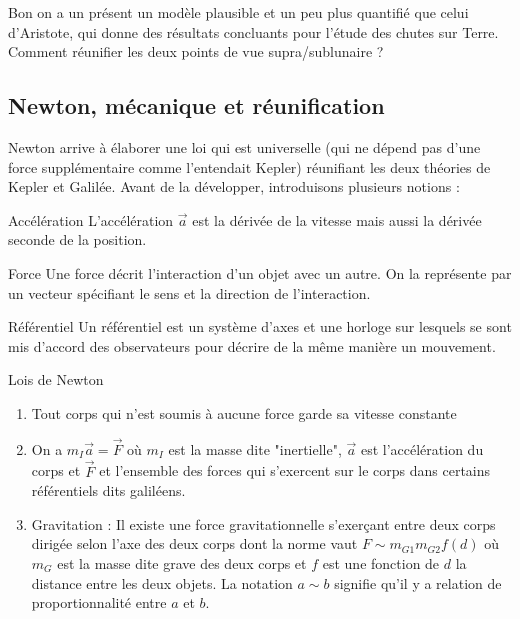 \documentclass{classe}
\begin{document}
Bon on a un présent un modèle plausible et un peu plus quantifié que celui d'Aristote, qui donne des résultats concluants pour l'étude des chutes sur Terre. Comment réunifier les deux points de vue supra/sublunaire ?

\subsection{Newton, mécanique et réunification}

Newton arrive à élaborer une loi qui est universelle (qui ne dépend pas d'une force supplémentaire comme l'entendait Kepler) réunifiant les deux théories de Kepler et Galilée. Avant de la développer, introduisons plusieurs notions :

\begin{définition}{Accélération}{}
L'accélération $\vec{a}$ est la dérivée de la vitesse mais aussi la dérivée seconde de la position.
\end{définition}

\begin{définition}{Force}{}
Une force décrit l'interaction d'un objet avec un autre. On la représente par un vecteur spécifiant le sens et la direction de l'interaction.
\end{définition}

\begin{définition}{Référentiel}{}
Un référentiel est un système d'axes et une horloge sur lesquels se sont mis d'accord des observateurs pour décrire de la même manière un mouvement.
\end{définition}

\begin{théorème}{Lois de Newton}{}
\begin{enumerate}
\item Tout corps qui n'est soumis à aucune force garde sa vitesse constante
\item On a $m_I\vec{a} = \vec{F}$ où $m_I$ est la masse dite "inertielle", $\vec{a}$ est l'accélération du corps et $\vec{F}$ et l'ensemble des forces qui s'exercent sur le corps dans certains référentiels dits galiléens.
\item Gravitation : Il existe une force gravitationnelle s'exerçant entre deux corps dirigée selon l'axe des deux corps dont la norme vaut
$F \sim m_{G1}m_{G2}f(d)$ où $m_G$ est la masse dite grave des deux corps et $f$ est une fonction de $d$ la distance entre les deux objets. La notation $a \sim b$ signifie qu'il y a relation de proportionnalité entre $a$ et $b$.
\end{enumerate}
\end{théorème}
\end{document}

